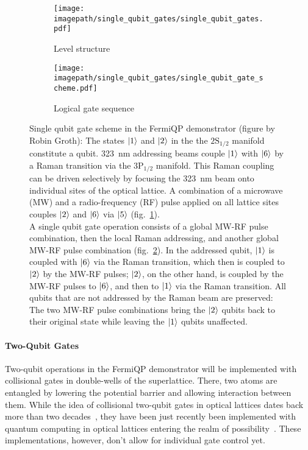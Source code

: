 \begin{figure}
    \centering
    \hspace{2.2cm}
    \begin{subfigure}[t]{0.25\textwidth}
        \centering
        \texttt{[image: \\imagepath/single\_qubit\_gates/single\_qubit\_gates.pdf]}
        \caption{Level structure}
        \label{fig:single_qubit_gates_levels}
    \end{subfigure}
    \begin{subfigure}[t]{0.55\textwidth}
        \centering
        \texttt{[image: \\imagepath/single\_qubit\_gates/single\_qubit\_gate\_scheme.pdf]}
        \caption{Logical gate sequence}
        \label{fig:single_qubit_gate_scheme}
    \end{subfigure}
    
    \caption{Single qubit gate scheme in the FermiQP demonstrator (figure by Robin Groth): The states $\Ket{1}$ and $\Ket{2}$ in the the $2\text{S}_{1/2}$ manifold constitute a qubit.
    \SI[]{323}{\nano\meter} addressing beams couple $\Ket{1}$ with $\Ket{6}$ by a Raman transition via the $3\text{P}_{1/2}$ manifold. This Raman coupling can be driven selectively by focusing the \SI[]{323}{\nano\meter} beam onto individual sites of the optical lattice.
    A combination of a microwave (MW) and a radio-frequency (RF) pulse applied on all lattice sites couples $\Ket{2}$ and $\Ket{6}$ via $\Ket{5}$ (fig.~\ref{fig:single_qubit_gates_levels}).\\
    A single qubit gate operation consists of a global MW-RF pulse combination, then the local Raman addressing, and another global MW-RF pulse combination (fig.~\ref{fig:single_qubit_gate_scheme}).
    In the addressed qubit, $\Ket{1}$ is coupled with $\Ket{6}$ via the Raman transition, which then is coupled to $\Ket{2}$ by the MW-RF pulses; $\Ket{2}$, on the other hand, is coupled by the MW-RF pulses to $\Ket{6}$, and then to $\Ket{1}$ via the Raman transition.
    All qubits that are not addressed by the Raman beam are preserved: The two MW-RF pulse combinations bring the $\Ket{2}$ qubits back to their original state while leaving the $\Ket{1}$ qubits unaffected.}
    \label{fig:single_qubit_gates}
\end{figure}

\paragraph*{Two-Qubit Gates}
Two-qubit operations in the FermiQP demonstrator will be implemented with collisional gates in double-wells of the superlattice. There, two atoms are entangled by lowering the potential barrier and allowing interaction between them. While the idea of collisional two-qubit gates in optical lattices dates back more than two decades~\cite{jaksch_fast_2000, anderlini_controlled_2006,trotzky_time-resolved_2008}, they have been just recently been implemented with quantum computing in optical lattices entering the realm of possibility~\cite{dai_generation_2016, yang_cooling_2020, zhang_functional_2022}. These implementations, however, don't allow for individual gate control yet.

